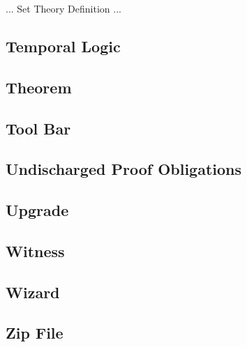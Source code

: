 ... Set Theory Definition ...

\subsection{Temporal Logic}
\label{temporal_logic}

\subsection{Theorem}
\label{theorem}

\subsection{Tool Bar}
\label{tool_bar}

\subsection{Undischarged Proof Obligations}
\label{undischarged_proof_obligations}

\subsection{Upgrade}
\label{Upgrade}


\subsection{Witness}
\label{witness}

\subsection{Wizard}
\label{wizard}

\subsection{Zip File}
\label{zip_file}


